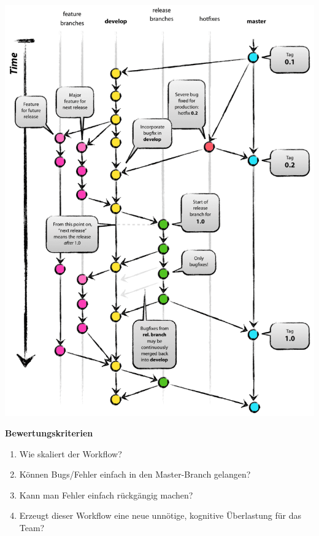 \begin{frame}[c]
    \centering
    \includegraphics[scale=.15]{../../pictures/git-flow}
\end{frame}

\begin{frame}[c]
    \slidehead
    \large
    \textbf{Bewertungskriterien}
    \normalsize
    \begin{enumerate}
        \item<2-> Wie skaliert der Workflow? 
        \item<4-> Können Bugs/Fehler einfach in den Master-Branch gelangen? 
        \item<6-> Kann man Fehler einfach rückgängig machen? 
        \item<8-> Erzeugt dieser Workflow eine neue unnötige, kognitive Überlastung für das Team? 
    \end{enumerate}
\end{frame}
